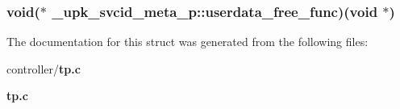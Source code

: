 \subsubsection[{userdata\_\-free\_\-func}]{\setlength{\rightskip}{0pt plus 5cm}void($\ast$ {\bf \_\-upk\_\-svcid\_\-meta\_\-p::userdata\_\-free\_\-func})(void $\ast$)}\label{struct__upk__svcid__meta__p_a43bbc7017aac9ab625afd4fb6b291e90}


The documentation for this struct was generated from the following files:\begin{DoxyCompactItemize}
\item 
controller/{\bf tp.c}\item 
{\bf tp.c}\end{DoxyCompactItemize}
